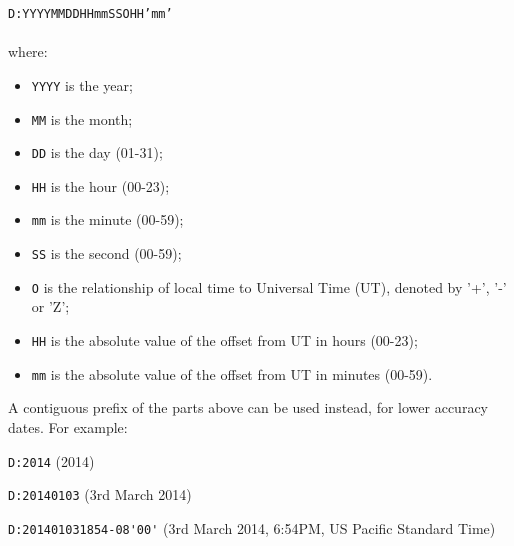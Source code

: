 \documentclass{book}
\begin{document}
\begin{framed}
\texttt{D:YYYYMMDDHHmmSSOHH'mm'}\\\\where:

\begin{itemize}
  \item \texttt{YYYY} is the year;
  \item \texttt{MM} is the month;
  \item \texttt{DD} is the day (01-31);
  \item \texttt{HH} is the hour (00-23);
  \item \texttt{mm} is the minute (00-59);
  \item \texttt{SS} is the second (00-59);
  \item \texttt{O} is the relationship of local time to Universal Time (UT), denoted by '+', '-' or 'Z';
  \item \texttt{HH} is the absolute value of the offset from UT in hours (00-23);
  \item \texttt{mm} is the absolute value of the offset from UT in minutes (00-59).
\end{itemize}
\end{framed}

\noindent A contiguous prefix of the parts above can be used instead, for lower
accuracy dates. For example:

\begin{framed}
   \small\noindent\verb!D:2014! (2014)
   
   \vspace{1.5mm}
   \noindent\verb!D:20140103! (3rd March 2014)

   \vspace{1.5mm}
   \noindent\verb!D:201401031854-08'00'! (3rd March 2014, 6:54PM, US Pacific Standard Time)
   
\end{framed}
\backmatter
\pagestyle{fancy}

\printindex
\end{document}
